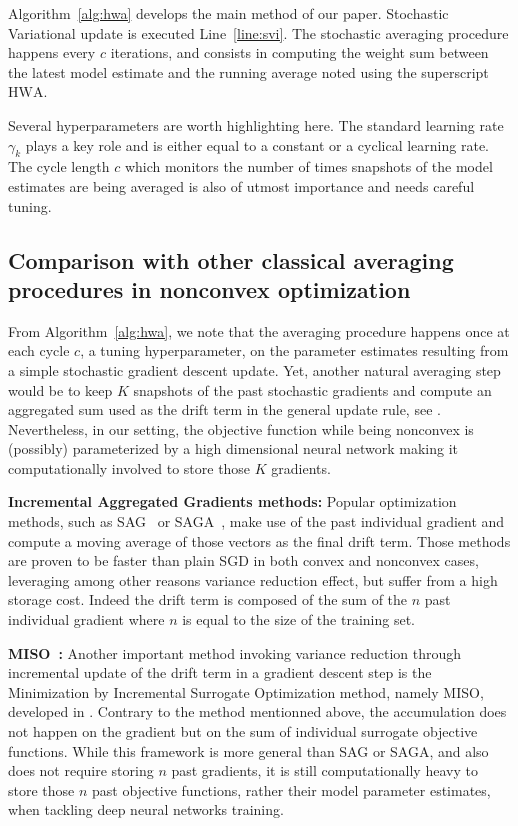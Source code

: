 \documentclass{article} %
\begin{document}
Algorithm~\ref{alg:hwa} develops the main method of our paper.
Stochastic Variational update is executed Line~\ref{line:svi}.
The stochastic averaging procedure happens every $c$ iterations, and consists in computing the weight sum between the latest model estimate and the running average noted using the superscript $\textrm{HWA}$.

Several hyperparameters are worth highlighting here.
The standard learning rate $\gamma_k$ plays a key role and is either equal to a constant or a cyclical learning rate.
The cycle length $c$ which monitors the number of times snapshots of the model estimates are being averaged is also of utmost importance and needs careful tuning.


\subsection{Comparison with other classical averaging procedures in nonconvex optimization}
From Algorithm~\ref{alg:hwa}, we note that the averaging procedure happens once at each cycle $c$, a tuning hyperparameter, on the parameter estimates resulting from a simple stochastic gradient descent update.
Yet, another natural averaging step would be to keep $K$ snapshots of the past stochastic gradients and compute an aggregated sum used as the drift term in the general update rule, see \citep{zhou2017convergence}.
Nevertheless, in our setting, the objective function while being nonconvex is (possibly) parameterized by a high dimensional neural network making it computationally involved to store those $K$ gradients.


\textbf{Incremental Aggregated Gradients methods:} Popular optimization methods, such as SAG~\citep{schmidt2017minimizing} or SAGA~\citep{defazio2014saga}, make use of the past individual gradient and compute a moving average of those vectors as the final drift term. Those methods are proven to be faster than plain SGD in both convex and nonconvex cases, leveraging among other reasons variance reduction effect, but suffer from a high storage cost. Indeed the drift term is composed of the sum of the $n$ past individual gradient where $n$ is equal to the size of the training set.


\textbf{MISO~\citep{mairal2015incremental}:} Another important method invoking variance reduction through incremental update of the drift term in a gradient descent step is the Minimization by Incremental Surrogate Optimization method, namely MISO, developed in \citet{mairal2015incremental}.
Contrary to the method mentionned above, the accumulation does not happen on the gradient but on the sum of individual surrogate objective functions.
While this framework is more general than SAG or SAGA, and also does not require storing $n$ past gradients, it is still computationally heavy to store those $n$ past objective functions, rather their model parameter estimates, when tackling deep neural networks training.
\end{document}
